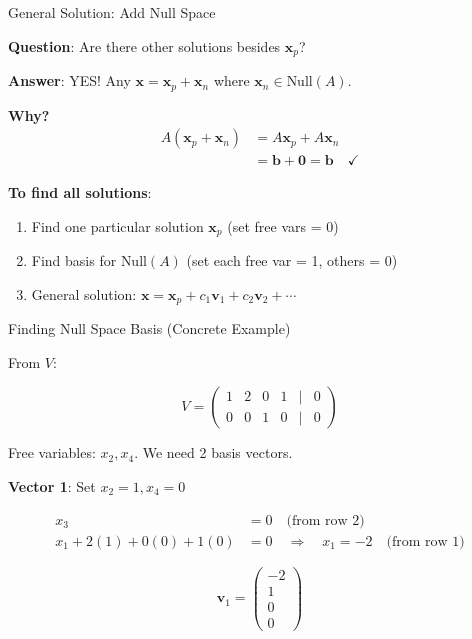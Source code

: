 \documentclass[10pt]{beamer}
\theoremstyle{definition}
\newcommand{\x}[1]{\alert{\textbf{#1}}}
\begin{document}
\begin{frame}{General Solution: Add Null Space}

\x{Question}: Are there other solutions besides $\mathbf{x}_p$?

\vspace{1em}

\x{Answer}: YES! Any $\mathbf{x} = \mathbf{x}_p + \mathbf{x}_n$ where $\mathbf{x}_n \in \text{Null}(A)$.

\vspace{0.5em}

\x{Why?}
\begin{align*}
A(\mathbf{x}_p + \mathbf{x}_n) &= A\mathbf{x}_p + A\mathbf{x}_n \\
&= \mathbf{b} + \mathbf{0} = \mathbf{b} \quad \checkmark
\end{align*}

\vspace{1em}

\x{To find all solutions}:
\begin{enumerate}
\item Find one particular solution $\mathbf{x}_p$ (set free vars = 0)
\item Find basis for $\text{Null}(A)$ (set each free var = 1, others = 0)
\item General solution: $\mathbf{x} = \mathbf{x}_p + c_1\mathbf{v}_1 + c_2\mathbf{v}_2 + \cdots$
\end{enumerate}

\end{frame}

\begin{frame}{Finding Null Space Basis (Concrete Example)}

From $V$:

$$V = \begin{pmatrix}
1 & 2 & 0 & 1 & \mid & 0 \\
0 & 0 & 1 & 0 & \mid & 0
\end{pmatrix}$$

Free variables: $x_2, x_4$. We need 2 basis vectors.

\vspace{1em}

\x{Vector 1}: Set $x_2 = 1, x_4 = 0$

\begin{align*}
x_3 &= 0 \quad \text{(from row 2)} \\
x_1 + 2(1) + 0(0) + 1(0) &= 0 \quad \Rightarrow \quad x_1 = -2 \quad \text{(from row 1)}
\end{align*}

$$\mathbf{v}_1 = \begin{pmatrix} -2 \\ 1 \\ 0 \\ 0 \end{pmatrix}$$

\end{frame}
\end{document}
